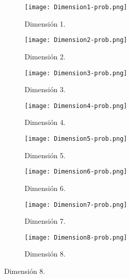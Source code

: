 \documentclass[12pt,letterpaper]{article}
\begin{document}
\begin{figure}
 	\centering
 	\caption{Porcentajes de regreso al origen.} 
 	\begin{subfigure}[b]{0.3\linewidth}
 		\caption{Dimensión 1.}
 		\texttt{[image: Dimension1-prob.png]}
 		 		\label{dim1}
 	\end{subfigure}
 	\begin{subfigure}[b]{0.3\linewidth}
 		\caption{Dimensión 2.}
 		\texttt{[image: Dimension2-prob.png]}
 		\label{dim2}
 	\end{subfigure}
 	\begin{subfigure}[b]{0.3\linewidth}
 		\caption{Dimensión 3.}
 		\texttt{[image: Dimension3-prob.png]}
 		\label{dim3}
 	\end{subfigure}
	\begin{subfigure}[b]{0.3\linewidth}
 		\caption{Dimensión 4.}
 		\texttt{[image: Dimension4-prob.png]}
 		\label{dim4}
 	\end{subfigure}
 		\begin{subfigure}[b]{0.3\linewidth}
 		\caption{Dimensión 5.}
 		\texttt{[image: Dimension5-prob.png]}
 		\label{dim5}
 	\end{subfigure}
 		\begin{subfigure}[b]{0.3\linewidth}
 		\caption{Dimensión 6.}
 		\texttt{[image: Dimension6-prob.png]}
 		\label{dim6}
 	\end{subfigure}
 	\vspace{10cm}
 		\begin{subfigure}[b]{0.3\linewidth}
 		\caption{Dimensión 7.}
 		\texttt{[image: Dimension7-prob.png]}
 		\label{dim7}
 	\end{subfigure}
 		\begin{subfigure}[b]{0.3\linewidth}
 		\caption{Dimensión 8.}
 		\texttt{[image: Dimension8-prob.png]}
 		\label{dim8}
 	\end{subfigure}
 	\label{porcentajes}
 \end{figure}
 
\end{document}
